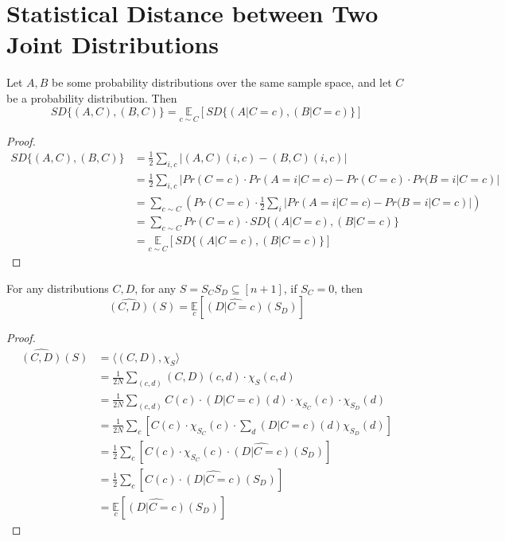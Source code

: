 \section{Statistical Distance between Two Joint Distributions}
\begin{theorem}
Let $A,B$ be some probability distributions over the same sample space, and let $C$ be a probability distribution. Then 
$$ SD \{(A,C), (B,C)\} 
= \underset{c \sim C} {\mathbb{E}} \left[ SD \{(A | C = c), (B | C=c)\} \right] $$
\end{theorem}
\begin{proof}
\begin{align*}
  SD \{(A,C), (B,C)\} 
& = \frac{1}{2} \sum\limits_{i,c} | (A,C)(i,c) - (B,C)(i,c)| \\
& = \frac{1}{2} \sum\limits_{i,c} | Pr(C = c) \cdot Pr(A = i | C =c) -
	                                Pr(C = c) \cdot Pr(B = i | C =c) |\\ 
& = \sum\limits_{c \sim C} \left( Pr(C = c) \cdot  \frac{1}{2} \sum\limits_{i} |Pr(A = i | C =c) - Pr(B = i | C =c) | \right) \\
& = \sum\limits_{c \sim C}  Pr(C = c) \cdot 
	SD \{(A | C = c), (B | C= c) \} \\ 
& = \underset{c \sim C} {\mathbb{E}} \left[ SD \{(A | C = c), (B | C=c)\} \right]		                                
\end{align*}
\end{proof}

\begin{claim}%
For any distributions $C,D$, for any $S = S_CS_D \subseteq [n+1]$, if $S_C = 0$, then 
$$\widehat{(C,D)}(S) = \underset {c} {\mathbb{E}} [\widehat{(D|C=c) }(S_D)] $$
\end{claim}

\begin{proof}
\begin{align*}
\widehat{(C,D)}(S) 
& = \langle (C,D), \chi_S \rangle \\
& = \frac{1}{2N} \sum\limits_{(c,d)}
	(C,D)(c,d) \cdot \chi_S(c,d) \\
& = \frac{1}{2N} \sum\limits_{(c,d)}
	C(c) \cdot (D | C = c)(d) \cdot \chi_{S_C}(c) \cdot \chi_{S_D}(d) \\
& = \frac{1}{2N} \sum\limits_{c} \left
				 [C(c) \cdot \chi_{S_C}(c) \cdot 
				 \sum\limits_{d} (D | C = c)(d)	\chi_{S_D}(d) \right] \\
& = \frac{1}{2} \sum\limits_{c} \left
				 [C(c) \cdot \chi_{S_C}(c) \cdot 
				 \widehat{(D|C=c) }(S_D) \right] \\	
& = \frac{1}{2} \sum\limits_{c} \left
				 [C(c) \cdot 
				 \widehat{(D|C=c) }(S_D) \right] \\
& = \underset {c} {\mathbb{E}} [\widehat{(D|C=c) }(S_D)]			 					 
\end{align*}							
\end{proof}

